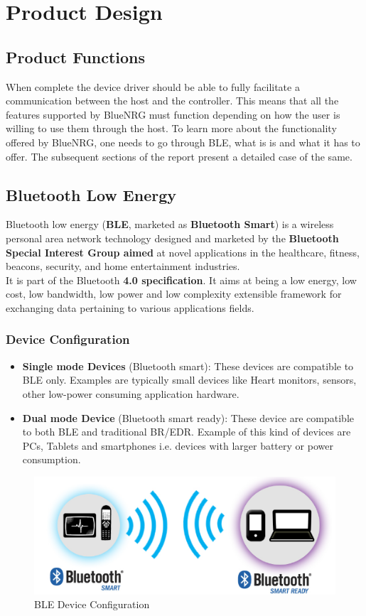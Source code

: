 \chapter{Product Design}
\section{Product Functions}
When complete the device driver should be able to fully facilitate a communication between the host and the controller. This means that all the features supported by BlueNRG must function depending on how the user is willing to use them through the host. To learn more about the functionality offered by BlueNRG, one needs to go through BLE, what is is and what it has to offer. The subsequent sections of the report present a detailed case of the same.
\section{Bluetooth Low Energy}
Bluetooth low energy (\textbf{BLE}, marketed as \textbf{Bluetooth Smart}) is a wireless personal area network technology designed and marketed by the \textbf{Bluetooth Special Interest Group aimed} at novel applications in the healthcare, fitness, beacons, security, and home entertainment industries. \\
It is part of the Bluetooth \textbf{4.0 specification}. It aims at being a low energy, low cost, low bandwidth, low power and low complexity extensible framework for exchanging data pertaining to various applications fields. 
\subsection{Device Configuration}
\begin{itemize}
	\item \textbf{Single mode Devices} (Bluetooth smart): These devices are compatible to BLE only. Examples are typically small devices like Heart monitors, sensors, other low-power consuming application hardware.
	\item \textbf{Dual mode Device} (Bluetooth smart ready): These device are compatible to both BLE and traditional BR/EDR. Example of this kind of devices are PCs, Tablets and smartphones i.e. devices with larger battery or power consumption.
\end{itemize}
\begin{figure}[ht]
	\centering
	\includegraphics[scale=0.5]{images/device_configuration.png}
	\caption{BLE Device Configuration}
\end{figure}
